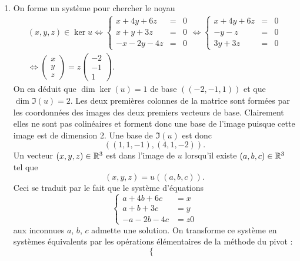 \begin{enumerate}
 \item On forme un système pour chercher le noyau
 \begin{multline*}
  (x,y,z)\in \ker u \Leftrightarrow
\left\lbrace 
\begin{array}{ccc}
 x+4y+6z & = & 0 \\
x+y+3z & = & 0 \\
-x -2y -4z & = & 0
\end{array}
\right. 
\Leftrightarrow 
\left\lbrace 
\begin{array}{ccc}
 x+4y+6z & = & 0 \\
-y-z & = & 0 \\
3y+3z & = & 0
\end{array}
\right. \\
\Leftrightarrow 
\left(
\begin{array}{c}
x \\ y\\ z
\end{array}
\right) =z\left( 
\begin{array}{c}
-2 \\ -1\\ 1
\end{array}
\right).
 \end{multline*}
On en déduit que $\dim \ker(u) = 1$ de base $((-2,-1,1))$ et que $\dim \Im (u) = 2$.\newline
Les deux premières colonnes de la matrice sont formées par les coordonnées des images des deux premiers vecteurs de base. Clairement elles ne sont pas colinéaires et forment donc une base de l'image puisque cette image est de dimension 2. Une base de $\Im(u)$ est donc
\[
 ((1,1,-1),(4,1,-2)).
\]
Un vecteur $(x,y,z) \in \mathbb{R}^3$ est dans l'image de $u$ lorsqu'il existe $(a,b,c) \in \mathbb{R}^3$ tel que 
\[
 (x,y,z) = u((a,b,c)).
\]
Ceci se traduit par le fait que le système d'équations
\begin{displaymath}
 \left\lbrace 
\begin{array}{ccc}
 a + 4b +6c &= x  \\
 a + b +3c &=  y \\
 -a -2b -4c &= z 0
\end{array}
\right.
\end{displaymath}
aux inconnues $a$, $b$, $c$ admette une solution. On transforme ce système en systèmes équivalents par les opérations élémentaires de la méthode du pivot :
\begin{displaymath}
 \left\lbrace 
\begin{array}{ccc}

\end{array}
\end{displaymath}
\end{enumerate}
